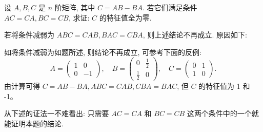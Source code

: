 \documentclass[../../main.tex]{subfiles}
\begin{document}
\begin{proposition}\label{proposition:经典矩阵乘法可交换诱导的性质例题}
设 \(A, B, C\) 是 \(n\) 阶矩阵, 其中 \(C = AB - BA\). 若它们满足条件 \(AC = CA, BC = CB\), 求证: \(C\) 的特征值全为零.
\end{proposition}
\begin{remark}
若将条件减弱为 \(ABC = CAB, BAC = CBA\), 则上述结论不再成立. 原因如下:

如将条件减弱为如题所述, 则结论不再成立, 可参考下面的反例:
\[
A = \begin{pmatrix}
1 & 0 \\ 
0 & -1
\end{pmatrix}, \quad
B = \begin{pmatrix}
0 & \frac{1}{2} \\ 
\frac{1}{2} & 0
\end{pmatrix}, \quad
C = \begin{pmatrix}
0 & 1 \\ 
1 & 0
\end{pmatrix}.
\]
由计算可得 \(C = AB - BA, ABC = CAB, CBA = BAC\), 但 \(C\) 的特征值为 1 和 -1。
\end{remark}
\begin{note}
从下述的{\color{blue}证法一}不难看出: 只需要 \(AC = CA\) 和 \(BC = CB\) 这两个条件中的一个就能证明本题的结论.
\end{note}
\end{document}
